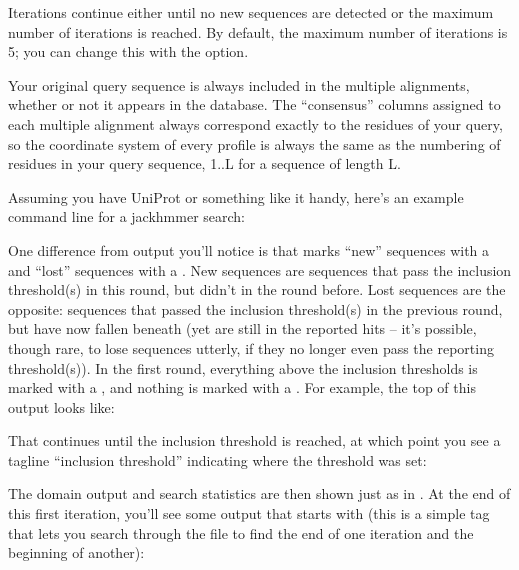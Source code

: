 Iterations continue either until no new sequences are detected or the
maximum number of iterations is reached. By default, the maximum
number of iterations is 5; you can change this with the 
option.

Your original query sequence is always included in the multiple
alignments, whether or not it appears in the database.  
The ``consensus'' columns assigned to each multiple alignment always
correspond exactly to the residues of your query, so the coordinate
system of every profile is always the same as the numbering of
residues in your query sequence, 1..L for a sequence of length L.

Assuming you have UniProt or something like it handy, here's an
example command line for a jackhmmer search:

   \vspace{1ex}
   \vspace{1ex}

One difference from  output you'll notice is that
 marks ``new'' sequences with a \mono{+} and ``lost''
sequences with a \mono{-}. New sequences are sequences that pass the
inclusion threshold(s) in this round, but didn't in the round before.
Lost sequences are the opposite: sequences that passed the inclusion
threshold(s) in the previous round, but have now fallen beneath (yet
are still in the reported hits -- it's possible, though rare, to lose
sequences utterly, if they no longer even pass the reporting
threshold(s)).  In the first round, everything above the inclusion
thresholds is marked with a \mono{+}, and nothing is marked with a
\mono{-}. For example, the top of this output looks like:


That continues until the inclusion threshold is reached, at which
point you see a tagline ``inclusion threshold'' indicating where the
threshold was set:


The domain output and search statistics are then shown just as in
. At the end of this first iteration, you'll see some
output that starts with  (this is a simple tag that lets you
search through the file to find the end of one iteration and the
beginning of another):

